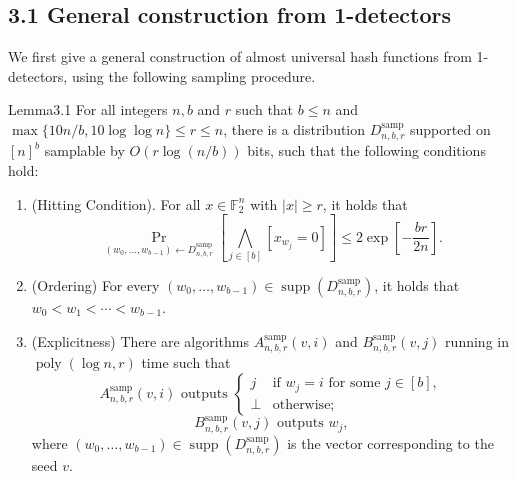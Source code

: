 \subsection*{3.1 General construction from 1-detectors}
We first give a general construction of almost universal hash functions from 1-detectors, using the following sampling procedure.
\begin{authorclaim}{Lemma3.1}
For all integers $n,b$ and $r$ such that $b\le n$ and $\max\{10n/b,10\log\log n\}\le r\le n$, there is a distribution $D^{\mathrm{samp}}_{n,b,r}$ supported on $[n]^b$ samplable by $O(r\log(n/b))$ bits, such that the following conditions hold:
\begin{enumerate}
\item (Hitting Condition). For all $x\in\mathbb F_2^n$ with $|x|\ge r$, it holds that
\begin{equation}\tag{1}
\Pr_{(w_0,\ldots,w_{b-1})\leftarrow D^{\mathrm{samp}}_{n,b,r}}\left[\bigwedge_{j\in[b]}[x_{w_j}=0]\right]\le2\exp\left[-\frac{br}{2n}\right].
\end{equation}
\item (Ordering) For every $(w_0,\ldots,w_{b-1})\in\operatorname{supp}(D^{\mathrm{samp}}_{n,b,r})$, it holds that $w_0<w_1<\cdots<w_{b-1}$.
\item (Explicitness) There are algorithms $A^{\mathrm{samp}}_{n,b,r}(v,i)$ and $B^{\mathrm{samp}}_{n,b,r}(v,j)$ running in $\operatorname{poly}(\log n,r)$ time such that
\[A^{\mathrm{samp}}_{n,b,r}(v,i)\text{ outputs }\begin{cases}j&\text{if }w_j=i\text{ for some }j\in[b],\\\bot&\text{otherwise;}\end{cases}\]
\[B^{\mathrm{samp}}_{n,b,r}(v,j)\text{ outputs }w_j,\]
where $(w_0,\ldots,w_{b-1})\in\operatorname{supp}(D^{\mathrm{samp}}_{n,b,r})$ is the vector corresponding to the seed $v$.
\end{enumerate}
\end{authorclaim}
